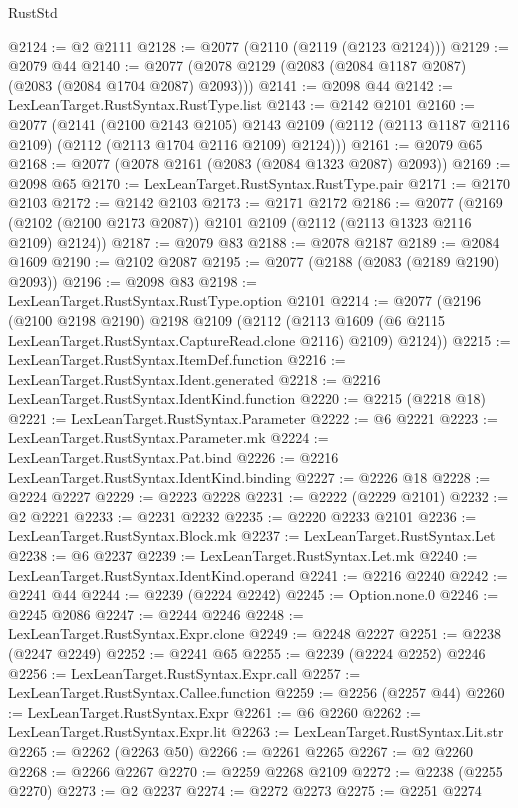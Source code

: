 \begin{lexlean}{RustStd}
\begin{coremodule}
@2124 := @2 @2111
@2128 := @2077 (@2110 (@2119 (@2123 @2124)))
@2129 := @2079 @44
@2140 := @2077 (@2078 @2129 (@2083 (@2084 @1187 @2087) (@2083 (@2084 @1704 @2087) @2093)))
@2141 := @2098 @44
@2142 := LexLeanTarget.RustSyntax.RustType.list
@2143 := @2142 @2101
@2160 := @2077
    (@2141
      (@2100 @2143 @2105)
      @2143
      @2109
      (@2112 (@2113 @1187 @2116 @2109) (@2112 (@2113 @1704 @2116 @2109) @2124)))
@2161 := @2079 @65
@2168 := @2077 (@2078 @2161 (@2083 (@2084 @1323 @2087) @2093))
@2169 := @2098 @65
@2170 := LexLeanTarget.RustSyntax.RustType.pair
@2171 := @2170 @2103
@2172 := @2142 @2103
@2173 := @2171 @2172
@2186 := @2077
    (@2169 (@2102 (@2100 @2173 @2087)) @2101 @2109 (@2112 (@2113 @1323 @2116 @2109) @2124))
@2187 := @2079 @83
@2188 := @2078 @2187
@2189 := @2084 @1609
@2190 := @2102 @2087
@2195 := @2077 (@2188 (@2083 (@2189 @2190) @2093))
@2196 := @2098 @83
@2198 := LexLeanTarget.RustSyntax.RustType.option @2101
@2214 := @2077
    (@2196
      (@2100 @2198 @2190)
      @2198
      @2109
      (@2112 (@2113 @1609 (@6 @2115 LexLeanTarget.RustSyntax.CaptureRead.clone @2116) @2109) @2124))
@2215 := LexLeanTarget.RustSyntax.ItemDef.function
@2216 := LexLeanTarget.RustSyntax.Ident.generated
@2218 := @2216 LexLeanTarget.RustSyntax.IdentKind.function
@2220 := @2215 (@2218 @18)
@2221 := LexLeanTarget.RustSyntax.Parameter
@2222 := @6 @2221
@2223 := LexLeanTarget.RustSyntax.Parameter.mk
@2224 := LexLeanTarget.RustSyntax.Pat.bind
@2226 := @2216 LexLeanTarget.RustSyntax.IdentKind.binding
@2227 := @2226 @18
@2228 := @2224 @2227
@2229 := @2223 @2228
@2231 := @2222 (@2229 @2101)
@2232 := @2 @2221
@2233 := @2231 @2232
@2235 := @2220 @2233 @2101
@2236 := LexLeanTarget.RustSyntax.Block.mk
@2237 := LexLeanTarget.RustSyntax.Let
@2238 := @6 @2237
@2239 := LexLeanTarget.RustSyntax.Let.mk
@2240 := LexLeanTarget.RustSyntax.IdentKind.operand
@2241 := @2216 @2240
@2242 := @2241 @44
@2244 := @2239 (@2224 @2242)
@2245 := Option.none.{0}
@2246 := @2245 @2086
@2247 := @2244 @2246
@2248 := LexLeanTarget.RustSyntax.Expr.clone
@2249 := @2248 @2227
@2251 := @2238 (@2247 @2249)
@2252 := @2241 @65
@2255 := @2239 (@2224 @2252) @2246
@2256 := LexLeanTarget.RustSyntax.Expr.call
@2257 := LexLeanTarget.RustSyntax.Callee.function
@2259 := @2256 (@2257 @44)
@2260 := LexLeanTarget.RustSyntax.Expr
@2261 := @6 @2260
@2262 := LexLeanTarget.RustSyntax.Expr.lit
@2263 := LexLeanTarget.RustSyntax.Lit.str
@2265 := @2262 (@2263 @50)
@2266 := @2261 @2265
@2267 := @2 @2260
@2268 := @2266 @2267
@2270 := @2259 @2268 @2109
@2272 := @2238 (@2255 @2270)
@2273 := @2 @2237
@2274 := @2272 @2273
@2275 := @2251 @2274

\end{coremodule}
\end{lexlean}
